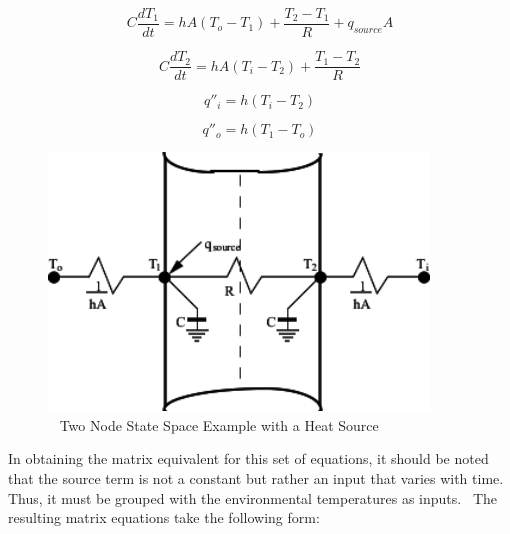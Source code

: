 \begin{equation}
C\frac{{d{T_1}}}{{dt}} = hA\left( {{T_o} - {T_1}} \right) + \frac{{{T_2} - {T_1}}}{R} + {q_{source}}A
\end{equation}

\begin{equation}
C\frac{{d{T_2}}}{{dt}} = hA\left( {{T_i} - {T_2}} \right) + \frac{{{T_1} - {T_2}}}{R}
\end{equation}

\begin{equation}
{q''_i} = h\left( {{T_i} - {T_2}} \right)
\end{equation}

\begin{equation}
{q''_o} = h\left( {{T_1} - {T_o}} \right)
\end{equation}

\begin{figure}[hbtp] %
\centering
\includegraphics[width=0.9\textwidth, height=0.9\textheight, keepaspectratio=true]{media/image6034.svg.png}
\caption{  Two Node State Space Example with a Heat Source \protect \label{fig:two-node-state-space-example-with-a-heat}}
\end{figure}

In obtaining the matrix equivalent for this set of equations, it should be noted that the source term is not a constant but rather an input that varies with time.~ Thus, it must be grouped with the environmental temperatures as inputs.~ The resulting matrix equations take the following form:

